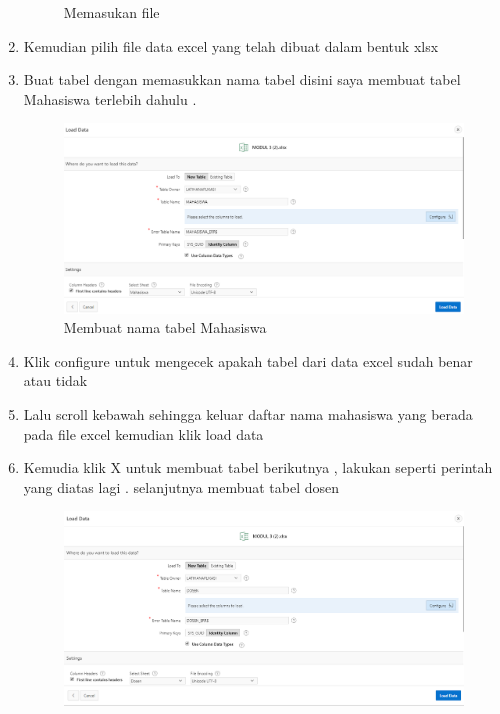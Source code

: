 \begin{enumerate}
\begin{figure}[!htbp]
        \caption{Memasukan file}
        \label{penanda}
    \end{figure}
\newline
    \item  Kemudian pilih file data excel yang telah dibuat dalam bentuk xlsx
\newline
    \item  Buat tabel dengan memasukkan nama tabel disini saya membuat tabel Mahasiswa terlebih dahulu .
    \newline
    \begin{figure}[!htbp]
        \centering
        \includegraphics[scale=0.5]{figures/4.png}
        \caption{Membuat nama tabel Mahasiswa}
        \label{fig:my_label}
    \end{figure}
\newline
    \item Klik configure untuk mengecek apakah tabel dari data excel sudah benar atau tidak 
\newline
    \item  Lalu scroll kebawah sehingga keluar daftar nama mahasiswa yang berada pada file excel kemudian klik load data 
\newline
    \item Kemudia klik X untuk membuat tabel berikutnya , lakukan seperti perintah yang diatas lagi . selanjutnya membuat tabel dosen 
\newline
    \begin{figure}[!htbp]
        \centering
        \includegraphics[scale=0.5]{figures/7.png}

\end{figure}
\end{enumerate}
